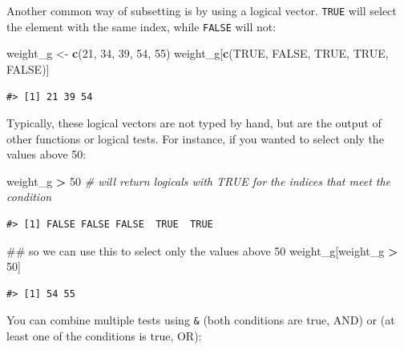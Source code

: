 \documentclass[]{book}
\newenvironment{Shaded}{\begin{snugshade}}{\end{snugshade}}
\newcommand{\KeywordTok}[1]{\textcolor[rgb]{0.13,0.29,0.53}{\textbf{#1}}}
\newcommand{\DecValTok}[1]{\textcolor[rgb]{0.00,0.00,0.81}{#1}}
\newcommand{\StringTok}[1]{\textcolor[rgb]{0.31,0.60,0.02}{#1}}
\newcommand{\CommentTok}[1]{\textcolor[rgb]{0.56,0.35,0.01}{\textit{#1}}}
\newcommand{\OtherTok}[1]{\textcolor[rgb]{0.56,0.35,0.01}{#1}}
\newcommand{\OperatorTok}[1]{\textcolor[rgb]{0.81,0.36,0.00}{\textbf{#1}}}
\newcommand{\NormalTok}[1]{#1}
\theoremstyle{definition}
\theoremstyle{definition}
\theoremstyle{remark}
\begin{document}
Another common way of subsetting is by using a logical vector.
\texttt{TRUE} will select the element with the same index, while
\texttt{FALSE} will not:

\begin{Shaded}
\begin{Highlighting}[]
\NormalTok{weight_g <-}\StringTok{ }\KeywordTok{c}\NormalTok{(}\DecValTok{21}\NormalTok{, }\DecValTok{34}\NormalTok{, }\DecValTok{39}\NormalTok{, }\DecValTok{54}\NormalTok{, }\DecValTok{55}\NormalTok{)}
\NormalTok{weight_g[}\KeywordTok{c}\NormalTok{(}\OtherTok{TRUE}\NormalTok{, }\OtherTok{FALSE}\NormalTok{, }\OtherTok{TRUE}\NormalTok{, }\OtherTok{TRUE}\NormalTok{, }\OtherTok{FALSE}\NormalTok{)]}
\end{Highlighting}
\end{Shaded}

\begin{verbatim}
#> [1] 21 39 54
\end{verbatim}

Typically, these logical vectors are not typed by hand, but are the
output of other functions or logical tests. For instance, if you wanted
to select only the values above 50:

\begin{Shaded}
\begin{Highlighting}[]
\NormalTok{weight_g }\OperatorTok{>}\StringTok{ }\DecValTok{50}    \CommentTok{# will return logicals with TRUE for the indices that meet the condition}
\end{Highlighting}
\end{Shaded}

\begin{verbatim}
#> [1] FALSE FALSE FALSE  TRUE  TRUE
\end{verbatim}

\begin{Shaded}
\begin{Highlighting}[]
\NormalTok{## so we can use this to select only the values above 50}
\NormalTok{weight_g[weight_g }\OperatorTok{>}\StringTok{ }\DecValTok{50}\NormalTok{]}
\end{Highlighting}
\end{Shaded}

\begin{verbatim}
#> [1] 54 55
\end{verbatim}

You can combine multiple tests using \texttt{\&} (both conditions are
true, AND) or \texttt{\textbar{}} (at least one of the conditions is
true, OR):
\end{document}

